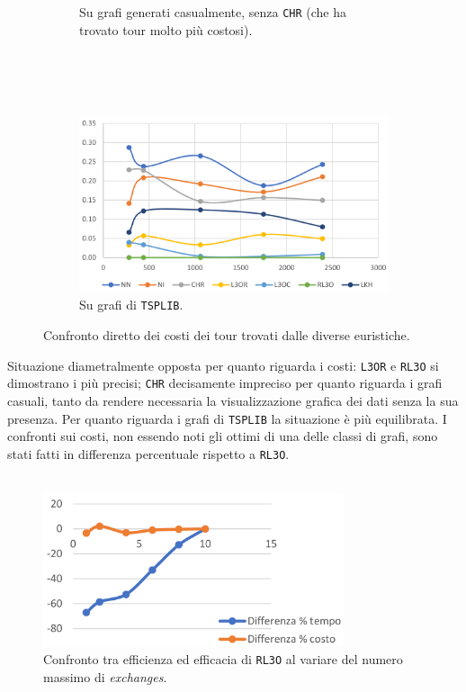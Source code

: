 \begin{figure}[H]
\begin{subfigure}{\linewidth}
        \caption*{Su grafi generati casualmente, senza \texttt{CHR} (che ha trovato tour 
                    molto più costosi).}
    \end{subfigure}
    \ \\
    \ \\
    \ \\
    \begin{subfigure}{\linewidth}
        \centering
        \includegraphics[width=270pt]{img/GraficoCostiTsplib.png}
        \caption*{Su grafi di \texttt{TSPLIB}.}
    \end{subfigure}
    \caption{Confronto diretto dei costi dei tour trovati dalle diverse euristiche.}
\end{figure}

Situazione diametralmente opposta per quanto riguarda i costi: \texttt{L3OR} e \texttt{RL3O} 
si dimostrano i più precisi; \texttt{CHR} decisamente impreciso per quanto riguarda i grafi 
casuali, tanto da rendere necessaria la visualizzazione grafica dei dati senza la sua presenza.
Per quanto riguarda i grafi di \texttt{TSPLIB} la situazione è più equilibrata. I confronti sui 
costi, non essendo noti gli ottimi di una delle classi di grafi, sono stati fatti in differenza 
percentuale rispetto a \texttt{RL3O}.
\ \\
\ \\

\begin{figure}[H]
    \centering
    \includegraphics[width=250pt]{img/GraficoScambi.png}
    \caption{Confronto tra efficienza ed efficacia di \texttt{RL3O} al variare del numero massimo 
                di \textit{exchanges}.}
\end{figure}

